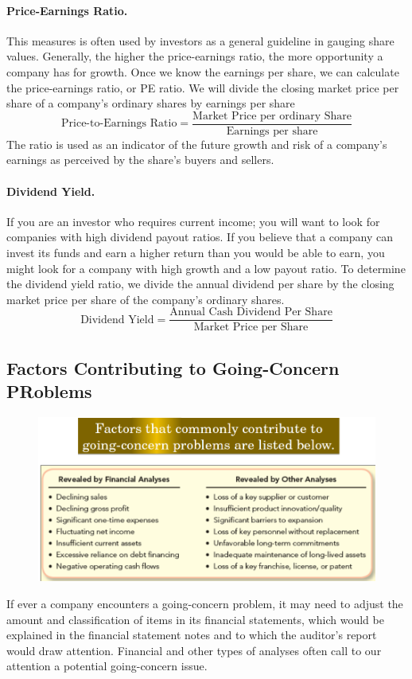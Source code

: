 \documentclass[../main.tex]{subfiles}
\begin{document}
	\paragraph{Price-Earnings Ratio.} This measures is often used by investors 
	as a general guideline in gauging share values. Generally, the higher the 
	price-earnings ratio, the more opportunity a company has for growth. Once 
	we know the earnings per share, we can calculate the price-earnings ratio, 
	or PE ratio.  We will divide the closing market price per share of a 
	company’s ordinary shares by earnings per share
	\[
	\text{Price-to-Earnings Ratio} = \frac{\text{Market Price per ordinary 
	Share}}{\text{Earnings per share}}
	\]
	The ratio is used as an indicator of the future growth and risk of a 
	company’s earnings as perceived by the share’s buyers and sellers.
	
	
	\paragraph{Dividend Yield.} If you are an investor who requires current 
	income; you will want to look for companies with high dividend payout 
	ratios.  If you believe that a company can invest its funds and earn a 
	higher return than you would be able to earn, you might look for a company 
	with high growth and a low payout ratio. To determine the dividend yield 
	ratio, we divide the annual dividend per share by the closing market price 
	per share of the company’s ordinary shares. 
	\[
	\text{Dividend Yield} = \frac{\text{Annual Cash Dividend Per 
	Share}}{\text{Market Price per Share}}
	\]
	
	\subsection{Factors Contributing to Going-Concern PRoblems}
	
	\begin{figure}[ht]
		\centering
		\includegraphics[width=\columnwidth]{images/c12/going_concern.png}
	\end{figure}

	If ever a company encounters a going-concern problem, it may need to adjust 
	the amount and classification of items in its financial statements, which 
	would be explained in the financial statement notes and to which the 
	auditor’s report would draw attention. Financial and other types of 
	analyses often call to our attention a potential going-concern issue.
\end{document}
